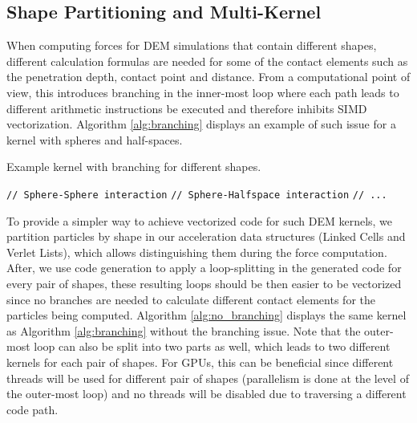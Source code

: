 \documentclass[preprint,12pt]{elsarticle}
\begin{document}
\subsection{Shape Partitioning and Multi-Kernel}
\label{sec:shape_partitioning}

When computing forces for DEM simulations that contain different shapes, different calculation formulas are needed for some of the contact elements such as the penetration depth, contact point and distance.
From a computational point of view, this introduces branching in the inner-most loop where each path leads to different arithmetic instructions be executed and therefore inhibits SIMD vectorization.
Algorithm \autoref{alg:branching} displays an example of such issue for a kernel with spheres and half-spaces.

\begin{algorithm}[H]
  \caption{Example kernel with branching for different shapes.}
  \label{alg:branching}
  \begin{algorithmic}[1]
          \State \texttt{// Sphere-Sphere interaction}
        \EndIf
          \State \texttt{// Sphere-Halfspace interaction}
        \EndIf
        \State \texttt{// ...}
      \EndFor
    \EndFor
  \end{algorithmic}
\end{algorithm}

To provide a simpler way to achieve vectorized code for such DEM kernels, we partition particles by shape in our acceleration data structures (Linked Cells and Verlet Lists), which allows distinguishing them during the force computation.
After, we use code generation to apply a loop-splitting in the generated code for every pair of shapes, these resulting loops should be then easier to be vectorized since no branches are needed to calculate different contact elements for the particles being computed.
Algorithm \autoref{alg:no_branching} displays the same kernel as Algorithm \autoref{alg:branching} without the branching issue.
Note that the outer-most loop can also be split into two parts as well, which leads to two different kernels for each pair of shapes.
For GPUs, this can be beneficial since different threads will be used for different pair of shapes (parallelism is done at the level of the outer-most loop) and no threads will be disabled due to traversing a different code path.
\end{document}
